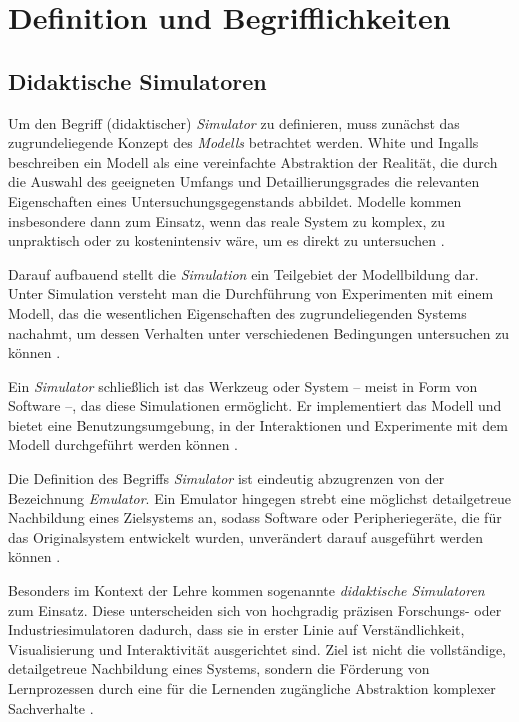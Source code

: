 \section{Definition und Begrifflichkeiten}

\subsection{Didaktische Simulatoren}
Um den Begriff (didaktischer) \textit{Simulator} zu definieren, muss zunächst das zugrundeliegende Konzept des \textit{Modells} betrachtet werden. White und Ingalls beschreiben ein Modell als eine vereinfachte Abstraktion der Realität, die durch die Auswahl des geeigneten Umfangs und Detaillierungsgrades die relevanten Eigenschaften eines Untersuchungsgegenstands abbildet. Modelle kommen insbesondere dann zum Einsatz, wenn das reale System zu komplex, zu unpraktisch oder zu kostenintensiv wäre, um es direkt zu untersuchen \parencites[S.~12]{white_introduction_2009}[S.~5]{banks_what_2008}.

Darauf aufbauend stellt die \textit{Simulation} ein Teilgebiet der Modellbildung dar. Unter Simulation versteht man die Durchführung von Experimenten mit einem Modell, das die wesentlichen Eigenschaften des zugrundeliegenden Systems nachahmt, um dessen Verhalten unter verschiedenen Bedingungen untersuchen zu können \parencites[S.~12]{white_introduction_2009}[S.~6]{banks_what_2008}.

Ein \textit{Simulator} schließlich ist das Werkzeug oder System -- meist in Form von Software --, das diese Simulationen ermöglicht. Er implementiert das Modell und bietet eine Benutzungsumgebung, in der Interaktionen und Experimente mit dem Modell durchgeführt werden können \parencite[S.~304f]{duran_what_2020}.

Die Definition des Begriffs \textit{Simulator} ist eindeutig abzugrenzen von der Bezeichnung \textit{Emulator}. Ein Emulator hingegen strebt eine möglichst detailgetreue Nachbildung eines Zielsystems an, sodass Software oder Peripheriegeräte, die für das Originalsystem entwickelt wurden, unverändert darauf ausgeführt werden können \parencite[S.~1683]{mcgregor_relationship_2002}.

Besonders im Kontext der Lehre kommen sogenannte \textit{didaktische Simulatoren} zum Einsatz. Diese unterscheiden sich von hochgradig präzisen Forschungs- oder Industriesimulatoren dadurch, dass sie in erster Linie auf Verständlichkeit, Visualisierung und Interaktivität ausgerichtet sind. Ziel ist nicht die vollständige, detailgetreue Nachbildung eines Systems, sondern die Förderung von Lernprozessen durch eine für die Lernenden zugängliche Abstraktion komplexer Sachverhalte \parencites[S.~256]{muller_entwicklung_2020}[S.~1]{nystrom_teaching_2024}.

